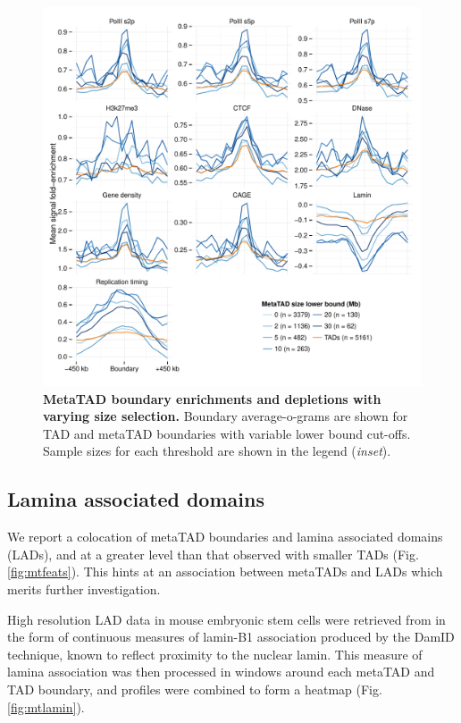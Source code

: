 \documentclass[a4paper,11pt,oneside]{book}
\begin{document}
\begin{figure}
\begin{center} 
\includegraphics[width=4.5in]{figs/metatad_cutoffenrich.pdf}
\captionsetup{width=\textwidth}
\caption[MetaTAD boundary enrichments and depletions with varying size selection.]{ {\bf MetaTAD boundary enrichments and depletions with varying size selection. }
Boundary average-o-grams are shown for TAD and metaTAD boundaries with variable lower bound cut-offs. Sample sizes for each threshold are shown in the legend (\emph{inset}).
}\label{fig:mtcutoffenrich}
\end{center}
\end{figure} 

\subsection{Lamina associated domains}\label{sec:mtlads}

We report a colocation of metaTAD boundaries and lamina associated domains (LADs), and at a greater level than that observed with smaller TADs (Fig. \ref{fig:mtfeats}). This hints at an association between metaTADs and LADs which merits further investigation.

High resolution LAD data in mouse embryonic stem cells were retrieved from \citet{Peric-Hupkes2010} in the form of continuous measures of lamin-B1 association produced by the DamID technique, known to reflect proximity to the nuclear lamin.\cite{Pickersgill2006} This measure of lamina association was then processed in windows around each metaTAD and TAD boundary, and profiles were combined to form a heatmap (Fig. \ref{fig:mtlamin}).
\end{document}
